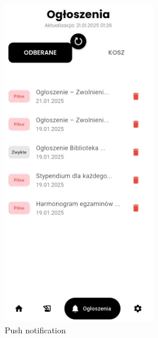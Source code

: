 \newpage
\begin{figure}[h!]
	\centering
	\includegraphics[width=0.6\textwidth]{rys/pushnotv2.png}
	\caption{Push notification}
	\label{rys:pushnotv2}
\end{figure}
\newpage


